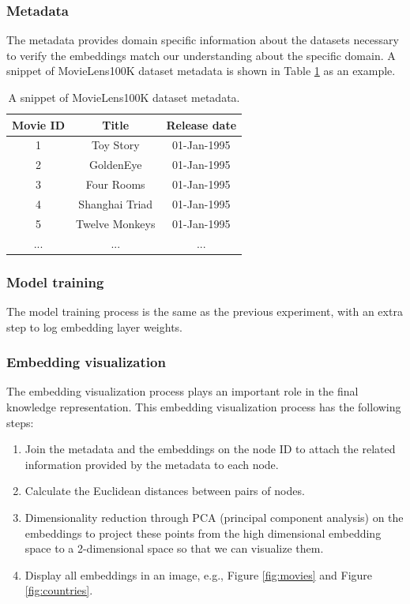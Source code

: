 \documentclass[12pt]{WSUThesis}
\theoremstyle{definition}
\begin{document}
\subsubsection{Metadata}
The metadata provides domain specific information about the datasets necessary to verify the embeddings match our understanding about the specific domain. A snippet of MovieLens100K dataset metadata is shown in Table \ref{tab:movielens100kmeta} as an example.
\begin{table}[!ht]
	\centering
	\caption{A snippet of MovieLens100K dataset metadata.}
	\begin{tabular}{ccc} \hline \rowcolor{blue!30}
		Movie ID & Title & Release date \\ \hline
		1 & Toy Story & 01-Jan-1995 \\ \hline
		2 & GoldenEye & 01-Jan-1995 \\ \hline
		3 & Four Rooms & 01-Jan-1995 \\ \hline
		4 & Shanghai Triad & 01-Jan-1995 \\ \hline
		5 & Twelve Monkeys & 01-Jan-1995 \\ \hline
		... & ... & ... \\ \hline
	\end{tabular}
	\label{tab:movielens100kmeta}
\end{table}

\subsubsection{Model training}
The model training process is the same as the previous experiment,
with an extra step to log embedding layer weights.

\subsubsection{Embedding visualization}
The embedding visualization process plays an important role in the final knowledge representation.
This embedding visualization process has the following steps:
\begin{enumerate}
	\item Join the metadata and the embeddings on the node ID to attach the related information provided by the metadata to each node.
	\item Calculate the Euclidean distances between pairs of nodes.
	\item Dimensionality reduction through PCA (principal component analysis) on the embeddings to project these points from the high dimensional embedding space to a 2-dimensional space so that we can visualize them.
	\item Display all embeddings in an image, e.g., Figure \ref{fig:movies} and Figure \ref{fig:countries}.
\end{enumerate}
\end{document}
